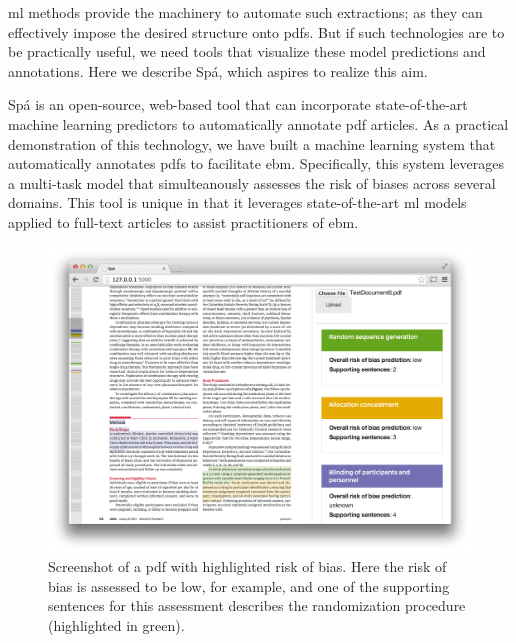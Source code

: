 \documentclass[runningheads,a4paper]{llncs}
\begin{document}
\ac{ml} methods provide the machinery to automate such extractions; as they can effectively impose the desired structure onto \acp{pdf}.
But if such technologies are to be practically useful, we need tools that visualize these model predictions and annotations.
Here we describe Spá, which aspires to realize this aim.

Spá is an open-source, web-based tool that can incorporate state-of-the-art machine learning predictors to automatically annotate \ac{pdf} articles.
As a practical demonstration of this technology, we have built a machine learning system that automatically annotates \acp{pdf} to facilitate \ac{ebm}.
Specifically, this system leverages a multi-task model that simulteanously assesses the risk of biases across several domains.
This tool is unique in that it leverages state-of-the-art \ac{ml} models applied to full-text articles to assist practitioners of \ac{ebm}.

\begin{figure}[htb]
\vspace{-1em}
\centering
\includegraphics[width=0.8\linewidth]{./images/screenshot2.png}
\vspace{-1em}
\caption{\label{fig:screenshot}Screenshot of a \ac{pdf} with highlighted risk of bias. Here the risk of bias is assessed to be low, for example, and one of the supporting sentences for this assessment describes the randomization procedure (highlighted in green).}
\vspace{-1em}
\end{figure}
\end{document}
